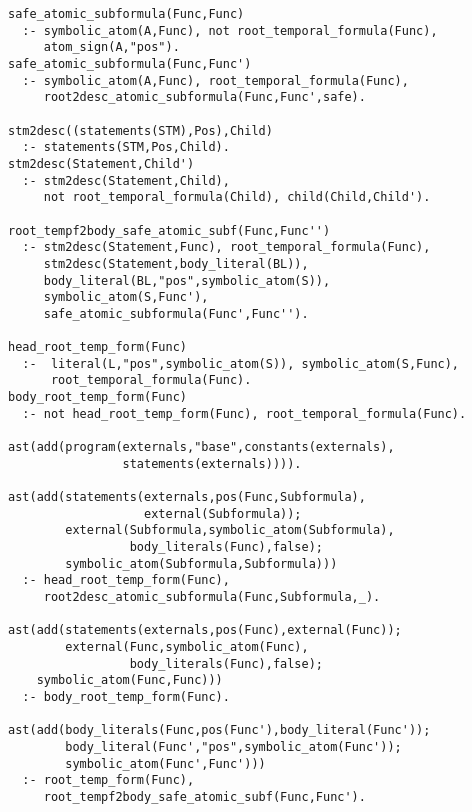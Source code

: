 \begin{center}
\begin{minipage}{\linewidth}
  \begin{lstlisting}[]
safe_atomic_subformula(Func,Func) 
  :- symbolic_atom(A,Func), not root_temporal_formula(Func), 
     atom_sign(A,"pos").
safe_atomic_subformula(Func,Func')
  :- symbolic_atom(A,Func), root_temporal_formula(Func),
     root2desc_atomic_subformula(Func,Func',safe).

stm2desc((statements(STM),Pos),Child) 
  :- statements(STM,Pos,Child).
stm2desc(Statement,Child') 
  :- stm2desc(Statement,Child), 
     not root_temporal_formula(Child), child(Child,Child').

root_tempf2body_safe_atomic_subf(Func,Func'')
  :- stm2desc(Statement,Func), root_temporal_formula(Func), 
     stm2desc(Statement,body_literal(BL)), 
     body_literal(BL,"pos",symbolic_atom(S)), 
     symbolic_atom(S,Func'), 
     safe_atomic_subformula(Func',Func'').

head_root_temp_form(Func)
  :-  literal(L,"pos",symbolic_atom(S)), symbolic_atom(S,Func),
      root_temporal_formula(Func).
body_root_temp_form(Func) 
  :- not head_root_temp_form(Func), root_temporal_formula(Func).

ast(add(program(externals,"base",constants(externals),
                statements(externals)))).

ast(add(statements(externals,pos(Func,Subformula),
                   external(Subformula));
        external(Subformula,symbolic_atom(Subformula),
                 body_literals(Func),false);
        symbolic_atom(Subformula,Subformula)))
  :- head_root_temp_form(Func), 
     root2desc_atomic_subformula(Func,Subformula,_).

ast(add(statements(externals,pos(Func),external(Func));
        external(Func,symbolic_atom(Func),
                 body_literals(Func),false);
	symbolic_atom(Func,Func)))
  :- body_root_temp_form(Func).

ast(add(body_literals(Func,pos(Func'),body_literal(Func'));
        body_literal(Func',"pos",symbolic_atom(Func'));
        symbolic_atom(Func',Func')))
  :- root_temp_form(Func),
     root_tempf2body_safe_atomic_subf(Func,Func').
\end{lstlisting}
\end{minipage}
\end{center}

